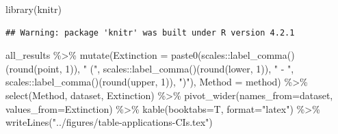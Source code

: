 \documentclass[
]{article}
\newenvironment{Shaded}{\begin{snugshade}}{\end{snugshade}}
\newcommand{\AttributeTok}[1]{\textcolor[rgb]{0.77,0.63,0.00}{#1}}
\newcommand{\DecValTok}[1]{\textcolor[rgb]{0.00,0.00,0.81}{#1}}
\newcommand{\FunctionTok}[1]{\textcolor[rgb]{0.00,0.00,0.00}{#1}}
\newcommand{\NormalTok}[1]{#1}
\newcommand{\SpecialCharTok}[1]{\textcolor[rgb]{0.00,0.00,0.00}{#1}}
\newcommand{\StringTok}[1]{\textcolor[rgb]{0.31,0.60,0.02}{#1}}
\begin{document}
\begin{Shaded}
\begin{Highlighting}[]
\FunctionTok{library}\NormalTok{(knitr)}
\end{Highlighting}
\end{Shaded}

\begin{verbatim}
## Warning: package 'knitr' was built under R version 4.2.1
\end{verbatim}

\begin{Shaded}
\begin{Highlighting}[]
\NormalTok{all\_results }\SpecialCharTok{\%\textgreater{}\%}
  \FunctionTok{mutate}\NormalTok{(}\AttributeTok{Extinction =} \FunctionTok{paste0}\NormalTok{(scales}\SpecialCharTok{::}\FunctionTok{label\_comma}\NormalTok{()(}\FunctionTok{round}\NormalTok{(point, }\DecValTok{1}\NormalTok{)), }\StringTok{" ("}\NormalTok{, scales}\SpecialCharTok{::}\FunctionTok{label\_comma}\NormalTok{()(}\FunctionTok{round}\NormalTok{(lower, }\DecValTok{1}\NormalTok{)), }\StringTok{" {-} "}\NormalTok{, scales}\SpecialCharTok{::}\FunctionTok{label\_comma}\NormalTok{()(}\FunctionTok{round}\NormalTok{(upper, }\DecValTok{1}\NormalTok{)), }\StringTok{")"}\NormalTok{),}
         \AttributeTok{Method =}\NormalTok{ method) }\SpecialCharTok{\%\textgreater{}\%}
  \FunctionTok{select}\NormalTok{(Method, dataset, Extinction) }\SpecialCharTok{\%\textgreater{}\%}
  \FunctionTok{pivot\_wider}\NormalTok{(}\AttributeTok{names\_from=}\NormalTok{dataset, }\AttributeTok{values\_from=}\NormalTok{Extinction) }\SpecialCharTok{\%\textgreater{}\%}
  \FunctionTok{kable}\NormalTok{(}\AttributeTok{booktabs=}\NormalTok{T, }\AttributeTok{format=}\StringTok{"latex"}\NormalTok{) }\SpecialCharTok{\%\textgreater{}\%}
  \FunctionTok{writeLines}\NormalTok{(}\StringTok{"../figures/table{-}applications{-}CIs.tex"}\NormalTok{)}
\end{Highlighting}
\end{Shaded}
\end{document}
